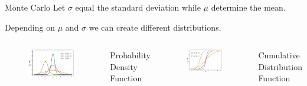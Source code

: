 \documentclass[12pt, aspectratio=169]{beamer}
\begin{document}
\begin{frame}{Monte Carlo}
Let $\sigma$ equal the standard deviation while $\mu$ determine the mean. 

Depending on $\mu$ and $\sigma$ we can create different distributions. 
\begin{columns}
    \centering
      \begin{figure}
        \includegraphics[width=\textwidth]{1024px-norm.png}
      \end{figure}
      Probability Density Function
     \centering
       \begin{figure}
         \includegraphics[width=\textwidth]{800px-dist.png}
       \end{figure}
       Cumulative Distribution Function
\end{columns}

\end{frame}
\end{document}
